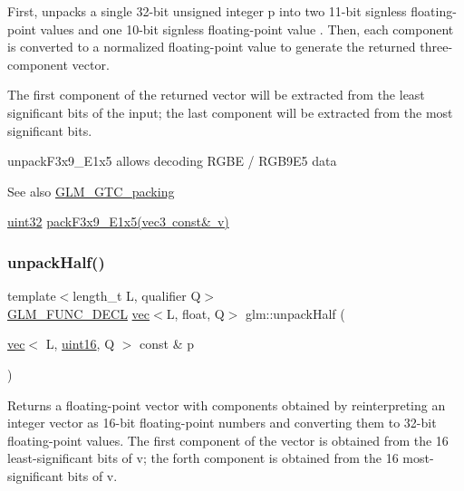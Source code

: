 First, unpacks a single 32-\/bit unsigned integer p into two 11-\/bit signless floating-\/point values and one 10-\/bit signless floating-\/point value . Then, each component is converted to a normalized floating-\/point value to generate the returned three-\/component vector.

The first component of the returned vector will be extracted from the least significant bits of the input; the last component will be extracted from the most significant bits.

unpack\+F3x9\+\_\+\+E1x5 allows decoding R\+G\+BE / R\+G\+B9\+E5 data

\begin{DoxySeeAlso}{See also}
\mbox{\hyperlink{group__gtc__packing}{G\+L\+M\+\_\+\+G\+T\+C\+\_\+packing}} 

\mbox{\hyperlink{group__gtc__type__precision_ga202b6a53c105fcb7e531f9b443518451}{uint32}} \mbox{\hyperlink{group__gtc__packing_ga0984f9598edc648d59a9643d9a61b121}{pack\+F3x9\+\_\+\+E1x5(vec3 const\& v)}} 
\end{DoxySeeAlso}
\mbox{\label{group__gtc__packing_ga30d6b2f1806315bcd6047131f547d33b}} 
\subsubsection{\texorpdfstring{unpack\+Half()}{unpackHalf()}}
{\footnotesize\ttfamily template$<$length\+\_\+t L, qualifier Q$>$ \\
\mbox{\hyperlink{setup_8hpp_ab2d052de21a70539923e9bcbf6e83a51}{G\+L\+M\+\_\+\+F\+U\+N\+C\+\_\+\+D\+E\+CL}} \mbox{\hyperlink{structglm_1_1vec}{vec}}$<$L, float, Q$>$ glm\+::unpack\+Half (\begin{DoxyParamCaption}\item[{\mbox{\hyperlink{structglm_1_1vec}{vec}}$<$ L, \mbox{\hyperlink{group__gtc__type__precision_gad8c2939e1fdd8e5828b31d95c52255d5}{uint16}}, Q $>$ const \&}]{p }\end{DoxyParamCaption})}

Returns a floating-\/point vector with components obtained by reinterpreting an integer vector as 16-\/bit floating-\/point numbers and converting them to 32-\/bit floating-\/point values. The first component of the vector is obtained from the 16 least-\/significant bits of v; the forth component is obtained from the 16 most-\/significant bits of v.

